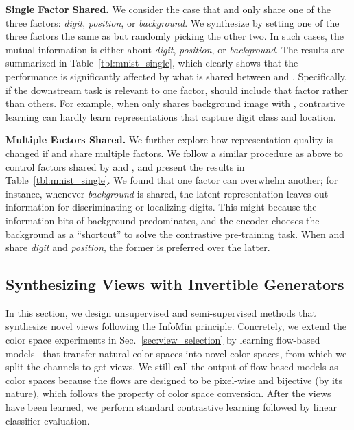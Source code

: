 \documentclass{article}
\begin{document}
\textbf{Single Factor Shared.} We consider the case that  and  only share one of the three factors: \emph{digit}, \emph{position}, or \emph{background}. 
We synthesize  by setting one of the three factors the same as  but randomly picking the other two.
In such cases, the mutual information  is either about \emph{digit}, \emph{position}, or \emph{background}. The
results are summarized in Table~\ref{tbl:mnist_single}, which clearly shows that the performance is significantly affected by what is shared between  and . Specifically, if the downstream task is relevant to one factor,  should include that factor rather than others. For example, when  only shares background image with , contrastive learning can hardly learn representations that capture digit class and location. 

\textbf{Multiple Factors Shared.} We further explore how representation quality is changed if  and  share multiple factors. We follow a similar procedure as above to control factors shared by  and , and present the results in Table~\ref{tbl:mnist_single}. We found that one factor can overwhelm another; for instance, whenever \emph{background} is shared, the latent representation leaves out information for discriminating or localizing digits. This might because the information bits of background predominates, and the encoder chooses the background as a ``shortcut'' to solve the contrastive pre-training task. When  and  share \emph{digit} and \emph{position}, the former is preferred over the latter.

 

\subsection{Synthesizing Views with Invertible Generators}\label{sec:learn}


In this section, we design unsupervised and semi-supervised methods that synthesize novel views following the InfoMin principle. Concretely, we extend the color space experiments in Sec.~\ref{sec:view_selection} by learning flow-based models~\cite{dinh2016density,dinh2014nice,kingma2018glow} that transfer natural color spaces into novel color spaces, from which we split the channels to get views. We still call the output of flow-based models as color spaces because the flows are designed to be pixel-wise and bijective (by its nature), which follows the property of color space conversion. After the views have been learned, we perform standard contrastive learning followed by linear classifier evaluation. 
\end{document}
